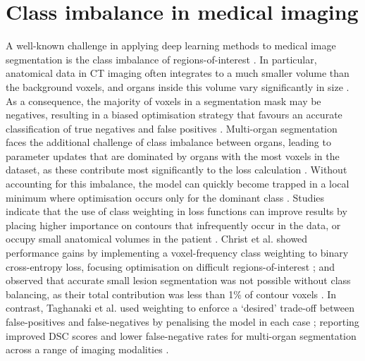 %
%
\section{Class imbalance in medical imaging}
A well-known challenge in applying deep learning methods to medical image segmentation is the class imbalance of regions-of-interest \cite{Hesamian2019}. In particular, anatomical data in CT imaging often integrates to a much smaller volume than the background voxels, and organs inside this volume vary significantly in size \cite{taghanaki2018}. As a consequence, the majority of voxels in a segmentation mask may be negatives, resulting in a biased optimisation strategy that favours an accurate classification of true negatives and false positives \cite{taghanaki2018} . Multi-organ segmentation faces the additional challenge of class imbalance between organs, leading to parameter updates that are dominated by organs with the most voxels in the dataset, as these contribute most significantly to the loss calculation \cite{Khan2019}. Without accounting for this imbalance, the model can quickly become trapped in a local minimum where optimisation occurs only for the dominant class \cite{Khan2019}. Studies indicate that the use of class weighting in loss functions can improve results by placing higher importance on contours that infrequently occur in the data, or occupy small anatomical volumes in the patient \cite{taghanaki2018}. Christ et al. showed performance gains by implementing a voxel-frequency class weighting to binary cross-entropy loss, focusing optimisation on difficult regions-of-interest \cite{ferdin2017}; and observed that accurate small lesion segmentation was not possible without class balancing, as their total contribution was less than 1\% of contour voxels \cite{ferdin2017}. In contrast, Taghanaki et al. used weighting to enforce a `desired' trade-off between false-positives and false-negatives by penalising the model in each case ; reporting improved DSC scores and lower false-negative rates for multi-organ segmentation across a range of imaging modalities \cite{taghanaki2018}.

 


